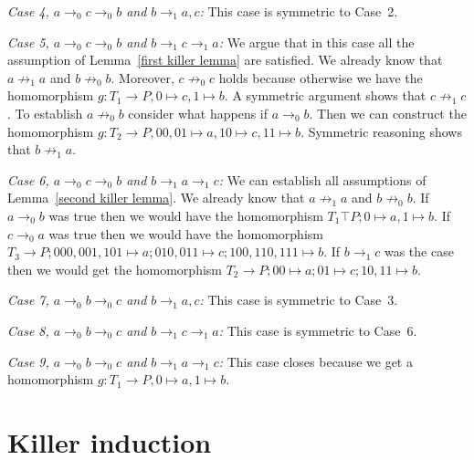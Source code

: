 \documentclass[a4paper]{article}
\newcommand{\case}[2]{\vspace{1ex}\noindent\textit{Case #1, #2:}}
\begin{document}
\case{4}{$a \rightarrow_0 c \rightarrow_0 b$ and $b \rightarrow_1 a,c$}
This case is symmetric to Case~2.

\case{5}{$a \rightarrow_0 c \rightarrow_0 b$ and $b \rightarrow_1 c
\rightarrow_1 a$}
We argue that in this case all the assumption of Lemma~\ref{first killer
lemma} are satisfied. We already know that $a \not \rightarrow_1 a$ and
$b \not \rightarrow_0 b$. Moreover, $c \not \rightarrow_0 c$ holds
because otherwise we have the homomorphism $g : T_1 \to P, 0 \mapsto c,
1 \mapsto b$. A symmetric argument shows that $c \not \rightarrow_1 c$.
To establish $a \not \rightarrow_0 b$ consider what happens if $a
\rightarrow_0 b$. Then we can construct the homomorphism $g : T_2 \to P,
00, 01 \mapsto a, 10 \mapsto c, 11 \mapsto b$. Symmetric reasoning shows
that $b \not \rightarrow_1 a$.

\case{6}{$a \rightarrow_0 c \rightarrow_0 b$ and $b \rightarrow_1 a
\rightarrow_1 c$}
We can establish all assumptions of Lemma~\ref{second killer lemma}. We
already know that $a \not \rightarrow_1 a$ and $b \not \rightarrow_0 b$.
If $a \rightarrow_0 b$ was true then we would have the homomorphism $T_1
\top P; 0 \mapsto a, 1 \mapsto b$. If $c \rightarrow_0 a$ was true then
we would have the homomorphism $T_3 \to P; 000,001,101 \mapsto a;
010,011 \mapsto c; 100,110,111 \mapsto b$. If $b \rightarrow_1 c$ was
the case then we would get the homomorphism $T_2 \to P; 00 \mapsto a; 01
\mapsto c; 10,11 \mapsto b$.


\case{7}{$a \rightarrow_0 b \rightarrow_0 c$ and $b \rightarrow_1 a,c$}
This case is symmetric to Case~3.

\case{8}{$a \rightarrow_0 b \rightarrow_0 c$ and $b \rightarrow_1 c
\rightarrow_1 a$}
This case is symmetric to Case~6.

\case{9}{$a \rightarrow_0 b \rightarrow_0 c$ and $b \rightarrow_1 a
\rightarrow_1 c$} This case closes because we get a homomorphism $g :
T_1 \to P, 0 \mapsto a, 1 \mapsto b$.

\section{Killer induction}
\end{document}
